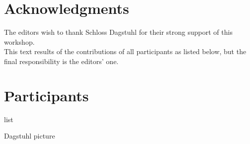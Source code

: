 \section{Acknowledgments}

The editors wish to thank Schloss Dagstuhl for their strong support of this workshop.\\
This text results of the contributions of all participants as listed below, but the final responsibility is the editors' one.

\section{Participants}

list

Dagstuhl picture




